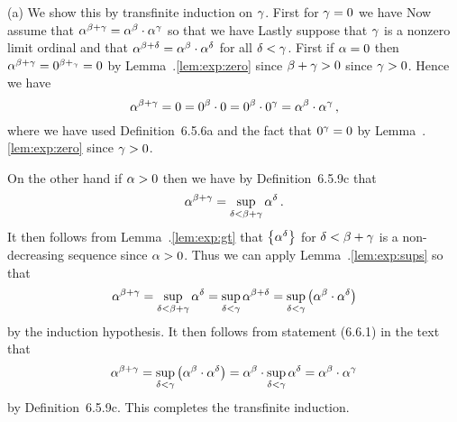 \begin{solution}
	(a)
    We show this by transfinite induction on $\gamma$.
    First for $\gamma = 0$ we have
    Now assume that $\alpha^{\beta + \gamma} = \alpha^\beta \cdot \alpha^\gamma$ so that we have
    Lastly suppose that $\gamma$ is a nonzero limit ordinal and that $\alpha^{\beta+\delta} = \alpha^\beta \cdot \alpha^\delta$ for all $\delta < \gamma$.
    First if $\alpha = 0$ then $\alpha^{\beta+\gamma} = 0^{\beta+_\gamma} = 0$ by Lemma~\ex.\ref{lem:exp:zero} since $\beta+\gamma > 0$ since $\gamma > 0$.
    Hence we have
    $$
    \alpha^{\beta+ \gamma} = 0 = 0^\beta \cdot 0 = 0^\beta \cdot 0^\gamma = \alpha^\beta \cdot \alpha^\gamma \,,
    $$
    where we have used Definition~6.5.6a and the fact that $0^\gamma = 0$ by Lemma~\ex.\ref{lem:exp:zero} since $\gamma > 0$.

    On the other hand if $\alpha > 0$ then we have by Definition~6.5.9c that
    $$
    \alpha^{\beta+\gamma} = \sup_{\delta < \beta+\gamma} \alpha^\delta \,.
    $$
    It then follows from Lemma~\ex.\ref{lem:exp:gt} that $\left\{ \alpha^\delta \right\}$ for $\delta < \beta + \gamma$ is a non-decreasing sequence since $\alpha > 0$.
    Thus we can apply Lemma~\ex.\ref{lem:exp:sups} so that
    $$
    \alpha^{\beta+\gamma} = \sup_{\delta < \beta+\gamma} \alpha^\delta = \sup_{\delta < \gamma} \alpha^{\beta + \delta} = \sup_{\delta < \gamma} \left( \alpha^\beta \cdot \alpha^\delta \right)
    $$
    by the induction hypothesis.
    It then follows from statement (6.6.1) in the text that
    $$
    \alpha^{\beta+\gamma} = \sup_{\delta < \gamma} \left( \alpha^\beta \cdot \alpha^\delta \right) = \alpha^\beta \cdot \sup_{\delta < \gamma} \alpha^\delta = \alpha^\beta \cdot \alpha^\gamma
    $$
    by Definition~6.5.9c.
    This completes the transfinite induction. \qedsymbol


\end{solution}
